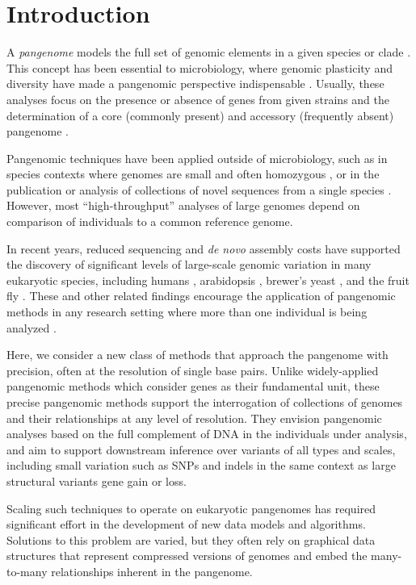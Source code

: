 \section{Introduction}

A \emph{pangenome} models the full set of genomic elements in a given species or clade \cite{sigaux2000cancer}.
This concept has been essential to microbiology, where genomic plasticity and diversity have made a pangenomic perspective indispensable \cite{tettelin2005genome,medini2005microbial}.
Usually, these analyses focus on the presence or absence of genes from given strains and the determination of a core (commonly present) and accessory (frequently absent) pangenome \cite{page2015roary}.

Pangenomic techniques have been applied outside of microbiology, such as in species contexts where genomes are small and often homozygous \cite{cao2011whole}, or in the publication or analysis of collections of novel sequences from a single species \cite{gao2019tomato,brohammer2018maize}.
However, most ``high-throughput'' analyses of large genomes depend on comparison of individuals to a common reference genome.

In recent years, reduced sequencing and \emph{de novo} assembly costs have supported the discovery of significant levels of large-scale genomic variation in many eukaryotic species, including humans \cite{li2010building,sudmant2010,sudmant2015integrated,chaisson2018multi}, arabidopsis \cite{alonso2016arabidopsis}, brewer's yeast \cite{yue2017contrasting}, and the fruit fly \cite{chakraborty2018hidden}.
These and other related findings encourage the application of pangenomic methods in any research setting where more than one individual is being analyzed \cite{computational2016computational}.

Here, we consider a new class of methods that approach the pangenome with precision, often at the resolution of single base pairs.
Unlike widely-applied pangenomic methods which consider genes as their fundamental unit, these precise pangenomic methods support the interrogation of collections of genomes and their relationships at any level of resolution.
They envision pangenomic analyses based on the full complement of DNA in the individuals under analysis, and aim to support downstream inference over variants of all types and scales, including small variation such as SNPs and indels in the same context as large structural variants gene gain or loss.

Scaling such techniques to operate on eukaryotic pangenomes has required significant effort in the development of new data models and algorithms.
Solutions to this problem are varied, but they often rely on graphical data structures that represent compressed versions of genomes and embed the many-to-many relationships inherent in the pangenome.

